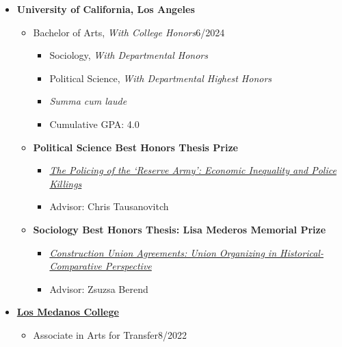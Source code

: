\begin{itemize}[leftmargin=0em, itemsep=0pt]
\item[] \textbf{University of California, Los Angeles}
\begin{itemize}[leftmargin=2em, itemsep=0pt]
    \item[] Bachelor of Arts, \textit{With College Honors}\hfill{}6/2024
    \begin{itemize}[leftmargin=2em, itemsep=0pt]
        \item[] Sociology, \textit{With Departmental Honors}
        \item[] Political Science, \textit{With Departmental Highest Honors}
    \item[] \textit{Summa cum laude}
    \item[] Cumulative GPA: 4.0
    \end{itemize}
    \vspace{6pt}
\item[] \textbf{Political Science Best Honors Thesis Prize}
\begin{itemize}[leftmargin=2em, itemsep=0pt, rightmargin=5em]
    \item[] \href{https://bit.ly/PolSciThesis}{\textit{The Policing of the `Reserve Army': Economic Inequality and Police Killings}}
    \item[] Advisor: Chris Tausanovitch
\end{itemize}
\vspace{6pt}
\item[] \textbf{Sociology Best Honors Thesis: Lisa Mederos Memorial Prize}
\begin{itemize}[leftmargin=2em, itemsep=0pt, rightmargin=5em]
    \item[] \href{https://bit.ly/SocThesis}{\textit{Construction Union Agreements: Union Organizing in Historical-Comparative Perspective}}
    \item[] Advisor: Zsuzsa Berend
    \end{itemize}
\end{itemize}
\vspace{12pt}
\item[] \textbf{\href{https://www.losmedanos.edu/}{Los Medanos College}}
\begin{itemize}[leftmargin=2em, itemsep=0pt]
    \item[] Associate in Arts for Transfer\hfill{}8/2022
    \begin{itemize}[leftmargin=2em, itemsep=0pt]

\end{itemize}
\end{itemize}
\end{itemize}
